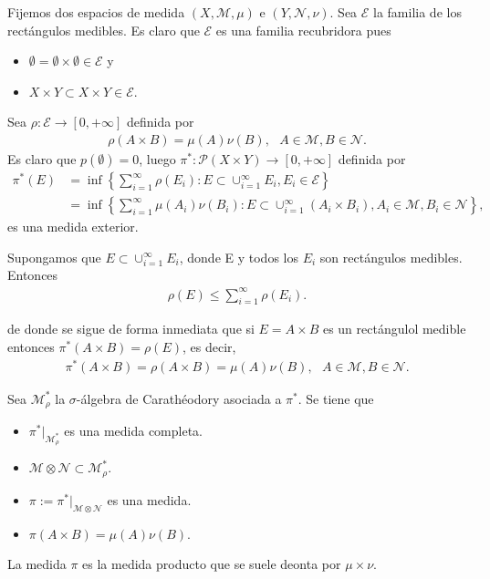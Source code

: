 Fijemos dos espacios de medida $(X, \mathcal{M}, \mu)$ e $(Y, \mathcal{N}, \nu)$. Sea $\mathcal{E}$ la familia de los rectángulos medibles. Es claro que $\mathcal{E}$ es una familia recubridora pues
\begin{itemize}
    \item $\emptyset = \emptyset \times \emptyset \in \mathcal{E}$ y
    \item $X \times Y \subset X \times Y \in \mathcal{E}$.
\end{itemize}
Sea $\rho : \mathcal{E} \longrightarrow [0,+\infty]$ definida por
\begin{align*}
    \rho(A \times B) = \mu(A)\nu(B), \ \ \ A \in \mathcal{M}, B \in \mathcal{N}.
\end{align*}
Es claro que $p(\emptyset) = 0$, luego $\pi^* : \mathcal{P}(X \times Y) \longrightarrow [0,+\infty]$ definida por
\begin{align*}
    \pi^*(E) & = \inf\left\{ \sum_{i=1}^{\infty}{\rho(E_i)} : E \subset \cup_{i=1}^{\infty}{E_i}, E_i \in \mathcal{E}\right\}                                            \\
             & = \inf\left\{ \sum_{i=1}^{\infty}{\mu(A_i)\nu(B_i)} : E \subset \cup_{i=1}^{\infty}{(A_i \times  B_i)}, A_i \in \mathcal{M}, B_i \in \mathcal{N}\right\},
\end{align*}
es una medida exterior.

\begin{prop}
    Supongamos que $E \subset \cup_{i=1}^{\infty}{E_i}$, donde E y todos los $E_i$ son rectángulos medibles. Entonces
    \begin{align*}
        \rho(E) \leq \sum_{i=1}^{\infty}{\rho(E_i)}.
    \end{align*}
\end{prop}
de donde se sigue de forma inmediata que si $E = A \times B$ es un rectángulol medible entonces $\pi^*(A \times B) = \rho(E)$, es decir,
\begin{align*}
    \pi^*(A \times B) = \rho(A \times B) = \mu(A)\nu(B), \ \ \ A \in \mathcal{M}, B \in \mathcal{N}.
\end{align*}

\begin{prop}
    Sea $\mathcal{M}^*_{\rho}$ la $\sigma$-álgebra de Carathéodory asociada a $\pi^*$. Se tiene que
    \begin{itemize}
        \item $\pi^*|_{\mathcal{M}^*_{\rho}}$ es una medida completa.
        \item $\mathcal{M} \otimes \mathcal{N} \subset \mathcal{M}^*_{\rho}$.
        \item $\pi := \pi^*|_{\mathcal{M} \otimes \mathcal{N}}$ es una medida.
        \item $\pi(A \times B) = \mu(A)\nu(B)$.
    \end{itemize}
\end{prop}
La medida $\pi$ es la medida producto que se suele deonta por $\mu \times \nu$.

